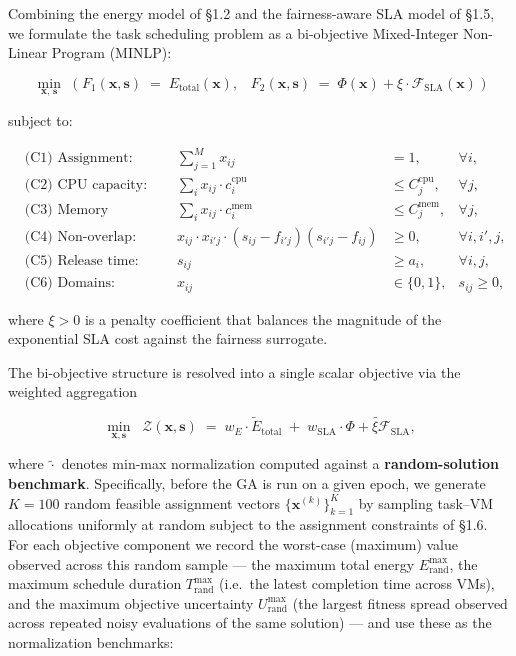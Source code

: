 \documentclass[11pt,a4paper]{article}
\begin{document}
Combining the energy model of §1.2 and the fairness-aware SLA model of §1.5, we formulate the task scheduling problem as a bi-objective Mixed-Integer Non-Linear Program (MINLP):

$$
\boxed{\;\min_{\mathbf{x},\,\mathbf{s}} \;\; \Big( \; F_1(\mathbf{x}, \mathbf{s}) \;=\; E_{\text{total}}(\mathbf{x}), \;\;\; F_2(\mathbf{x}, \mathbf{s}) \;=\; \Phi(\mathbf{x}) + \xi \cdot \mathcal{F}_{\text{SLA}}(\mathbf{x}) \;\Big) \;}
$$

subject to:

$$
\begin{aligned}
&\text{(C1) Assignment:} & \sum_{j=1}^{M} x_{ij} &= 1, & \forall i, \\
&\text{(C2) CPU capacity:} & \sum_{i} x_{ij} \cdot c^{\text{cpu}}_i &\leq C^{\text{cpu}}_j, & \forall j, \\
&\text{(C3) Memory capacity:} & \sum_{i} x_{ij} \cdot c^{\text{mem}}_i &\leq C^{\text{mem}}_j, & \forall j, \\
&\text{(C4) Non-overlap:} & x_{ij}\cdot x_{i'j}\cdot (s_{ij} - f_{i'j})(s_{i'j} - f_{ij}) &\geq 0, & \forall i, i', j, \\
&\text{(C5) Release time:} & s_{ij} &\geq a_i, & \forall i, j, \\
&\text{(C6) Domains:} & x_{ij} &\in \{0,1\}, & s_{ij} \geq 0,
\end{aligned}
$$

where $\xi > 0$ is a penalty coefficient that balances the magnitude of the exponential SLA cost against the fairness surrogate.

The bi-objective structure is resolved into a single scalar objective via the weighted aggregation

$$
\min_{\mathbf{x}, \mathbf{s}} \;\; \mathcal{Z}(\mathbf{x}, \mathbf{s}) \;=\; w_E \cdot \tilde{E}_{\text{total}} \;+\; w_{\text{SLA}} \cdot \widetilde{\Phi + \xi \mathcal{F}_{\text{SLA}}},
$$

where $\tilde{\cdot}$ denotes min-max normalization computed against a \textbf{random-solution benchmark}. Specifically, before the GA is run on a given epoch, we generate $K = 100$ random feasible assignment vectors $\{\mathbf{x}^{(k)}\}_{k=1}^{K}$ by sampling task--VM allocations uniformly at random subject to the assignment constraints of §1.6. For each objective component we record the worst-case (maximum) value observed across this random sample --- the maximum total energy $E^{\max}_{\text{rand}}$, the maximum schedule duration $T^{\max}_{\text{rand}}$ (i.e.\ the latest completion time across VMs), and the maximum objective uncertainty $U^{\max}_{\text{rand}}$ (the largest fitness spread observed across repeated noisy evaluations of the same solution) --- and use these as the normalization benchmarks:
\end{document}
